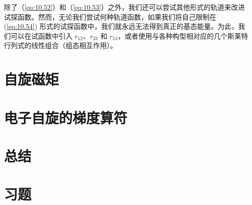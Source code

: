     除了（\ref{eq:10.52}）和（\ref{eq:10.53}）之外，我们还可以尝试其他形式的轨道来改进试探函数。然而，无论我们尝试何种轨道函数，如果我们将自己限制在 (\ref{eq:10.54}) 形式的试探函数中，我们就永远无法得到真正的基态能量。为此，我们可以在试函数中引入 $r_{12}$、$r_{23}$ 和 $r_{13}$，或者使用与各种构型相对应的几个斯莱特行列式的线性组合（组态相互作用）。

\section{自旋磁矩}
\label{sec:10.9 Spin Magnetic Moment}













\section{电子自旋的梯度算符}
\label{sec:10.10 Ladder Operators for Electron Spin}

\section*{总结}

\section*{习题}